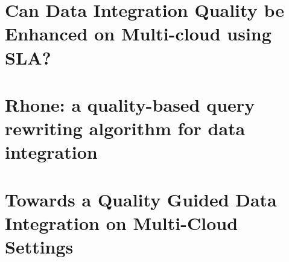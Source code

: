 \chapter{Can Data Integration Quality be Enhanced on Multi-cloud using SLA?}
\label{chap:appendix1}



\chapter{Rhone: a quality-based query rewriting algorithm for data integration}
\label{chap:appendix2}


\chapter{Towards a Quality Guided Data Integration on Multi-Cloud Settings}
\label{chap:appendix3}
